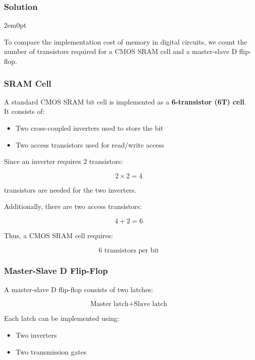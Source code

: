 \documentclass[main.tex]{subfiles}
\begin{document}
\subsubsection{Solution}
\begin{adjustwidth}{2em}{0pt}

    
    
    To compare the implementation cost of memory in digital circuits, we count the number of transistors required for a CMOS SRAM cell and a master-slave D flip-flop.
    
    \subsubsection*{SRAM Cell}
    
    A standard CMOS SRAM bit cell is implemented as a \textbf{6-transistor (6T) cell}. It consists of:
    
    \begin{itemize}
        \item Two cross-coupled inverters used to store the bit
        \item Two access transistors used for read/write access
    \end{itemize}
    
    Since an inverter requires 2 transistors:
    
    \[
    2 \times 2 = 4
    \]
    
    transistors are needed for the two inverters.
    
    Additionally, there are two access transistors:
    
    \[
    4 + 2 = 6
    \]
    
    Thus, a CMOS SRAM cell requires:
    
    \[
    \boxed{6 \text{ transistors per bit}}
    \]
    
    \subsubsection*{Master-Slave D Flip-Flop}
    
    A master-slave D flip-flop consists of two latches:
    
    \[
    \text{Master latch} + \text{Slave latch}
    \]
    
    Each latch can be implemented using:
    
    \begin{itemize}
        \item Two inverters
        \item Two transmission gates
    \end{itemize}
    

\end{adjustwidth}
\end{document}
